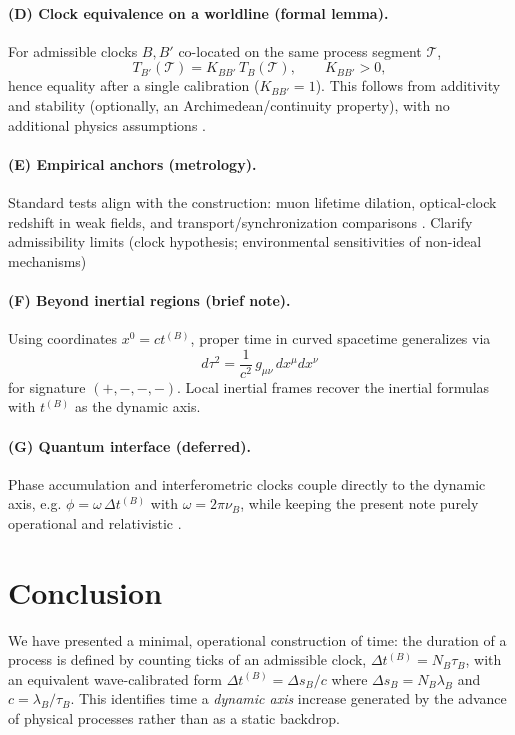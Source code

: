 \documentclass[12pt]{article}
\begin{document}
\paragraph{(D) Clock equivalence on a worldline (formal lemma).}
For admissible clocks \(B,B'\) co-located on the same process segment \(\mathcal T\),
\[
T_{B'}(\mathcal T)=K_{BB'}\,T_B(\mathcal T),\qquad K_{BB'}>0,
\]
hence equality after a single calibration (\(K_{BB'}=1\)). This follows from additivity and
stability (optionally, an Archimedean/continuity property), with no additional physics assumptions
\cite{RovelliPartial}.

\paragraph{(E) Empirical anchors (metrology).}
Standard tests align with the construction: muon lifetime dilation, optical-clock
redshift in weak fields, and transport/synchronization comparisons \cite{Bailey1977,Chou2010,HafeleKeating1972a,Ashby2003}.
Clarify admissibility limits (clock hypothesis; environmental sensitivities of non-ideal mechanisms)

\paragraph{(F) Beyond inertial regions (brief note).}
Using coordinates \(x^0=ct^{(B)}\), proper time in curved spacetime generalizes via
\[
d\tau^2=\frac{1}{c^2}\,g_{\mu\nu}\,dx^\mu dx^\nu
\]
for signature \((+,-,-,-)\). Local inertial frames recover the inertial formulas with \(t^{(B)}\)
as the dynamic axis.

\paragraph{(G) Quantum interface (deferred).}
Phase accumulation and interferometric clocks couple directly to the dynamic axis,
e.g. \(\phi=\omega\,\Delta t^{(B)}\) with \(\omega=2\pi\nu_B\), while keeping the present note
purely operational and relativistic \cite{Ramsey1950}.

\section{Conclusion}
We have presented a minimal, operational construction of time: the duration of a process
is defined by counting ticks of an admissible clock, \(\Delta t^{(B)}=N_B\tau_B\), with an
equivalent wave-calibrated form \(\Delta t^{(B)}=\Delta s_B/c\) where \(\Delta s_B=N_B\lambda_B\)
and \(c=\lambda_B/\tau_B\). This identifies time a \emph{dynamic axis} increase generated by
the advance of physical processes rather than as a static backdrop.
\end{document}
